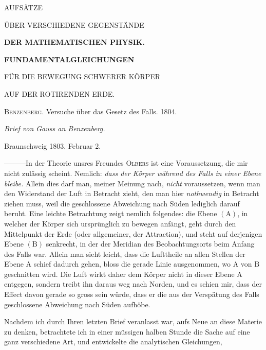 \clearpage
{}
\thispagestyle{empty}
\vspace*{0.23\textheight}
\begin{center}
{\Large AUFSÄTZE\par}
\vspace{2\baselineskip}
{\large ÜBER VERSCHIEDENE GEGENSTÄNDE\par}
\vspace{2\baselineskip}
{\Large\bfseries DER MATHEMATISCHEN PHYSIK.\par}
\end{center}
\clearpage
{}
\begin{center}
{\large\bfseries FUNDAMENTALGLEICHUNGEN\par\medskip FÜR DIE BEWEGUNG SCHWERER KÖRPER\par\medskip AUF DER ROTIRENDEN ERDE.\par}
\bigskip
\textsc{Benzenberg}. Versuche über das Gesetz des Falls. 1804.
\par\bigskip
{\large\itshape Brief von Gauss an Benzenberg.\par}
\end{center}
\begin{flushright}Braunschweig 1803. Februar 2.\end{flushright}
—\quad—\quad—\quad In der Theorie unsres Freundes \textsc{Olbers} ist eine Voraussetzung, die mir nicht zulässig scheint. Nemlich: \textit{dass der Körper während des Falls in einer Ebene bleibe.} Allein dies darf man, meiner Meinung nach, \textit{nicht} voraussetzen, wenn man den Widerstand der Luft in Betracht zieht, den man hier \textit{nothwendig} in Betracht ziehen muss, weil die geschlossene Abweichung nach Süden lediglich darauf beruht. Eine leichte Betrachtung zeigt nemlich folgendes: die Ebene $(\mathrm{A})$, in welcher der Körper sich ursprünglich zu bewegen anfängt, geht durch den Mittelpunkt der Erde (oder allgemeiner, der Attraction), und steht auf derjenigen Ebene $(\mathrm{B})$ senkrecht, in der der Meridian des Beobachtungsorts beim Anfang des Falls war. Allein man sieht leicht, dass die Lufttheile an allen Stellen der Ebene $\mathrm{A}$ schief dadurch gehen, bloss die gerade Linie ausgenommen, wo $\mathrm{A}$ von $\mathrm{B}$ geschnitten wird. Die Luft wirkt daher dem Körper nicht in dieser Ebene $\mathrm{A}$ entgegen, sondern treibt ihn daraus weg nach Norden, und es schien mir, dass der Effect davon gerade so gross sein würde, dass er die aus der Verspätung des Falls geschlossene Abweichung nach Süden aufhöbe.

Nachdem ich durch Ihren letzten Brief veranlasst war, aufs Neue an diese Materie zu denken, betrachtete ich in einer müssigen halben Stunde die Sache auf eine ganz verschiedene Art, und entwickelte die analytischen Gleichungen,
